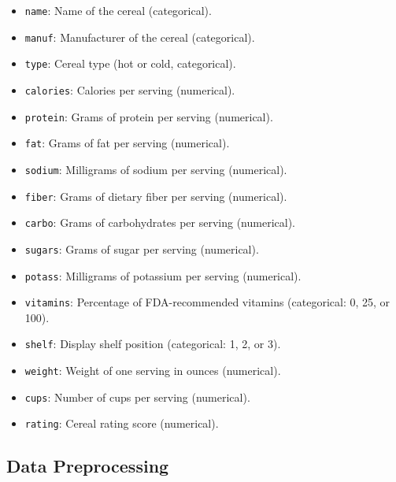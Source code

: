 \documentclass[
  11pt,
]{book}
\providecommand{\tightlist}{%
  \setlength{\itemsep}{0pt}\setlength{\parskip}{0pt}}
\theoremstyle{definition}
\theoremstyle{definition}
\theoremstyle{definition}
\theoremstyle{definition}
\theoremstyle{remark}
\begin{document}
\begin{itemize}
\tightlist
\item
  \texttt{name}: Name of the cereal (categorical).\\
\item
  \texttt{manuf}: Manufacturer of the cereal (categorical).\\
\item
  \texttt{type}: Cereal type (hot or cold, categorical).\\
\item
  \texttt{calories}: Calories per serving (numerical).\\
\item
  \texttt{protein}: Grams of protein per serving (numerical).\\
\item
  \texttt{fat}: Grams of fat per serving (numerical).\\
\item
  \texttt{sodium}: Milligrams of sodium per serving (numerical).\\
\item
  \texttt{fiber}: Grams of dietary fiber per serving (numerical).\\
\item
  \texttt{carbo}: Grams of carbohydrates per serving (numerical).\\
\item
  \texttt{sugars}: Grams of sugar per serving (numerical).\\
\item
  \texttt{potass}: Milligrams of potassium per serving (numerical).\\
\item
  \texttt{vitamins}: Percentage of FDA-recommended vitamins (categorical: 0, 25, or 100).\\
\item
  \texttt{shelf}: Display shelf position (categorical: 1, 2, or 3).\\
\item
  \texttt{weight}: Weight of one serving in ounces (numerical).\\
\item
  \texttt{cups}: Number of cups per serving (numerical).\\
\item
  \texttt{rating}: Cereal rating score (numerical).
\end{itemize}

\subsection{Data Preprocessing}\label{data-preprocessing}
\end{document}
